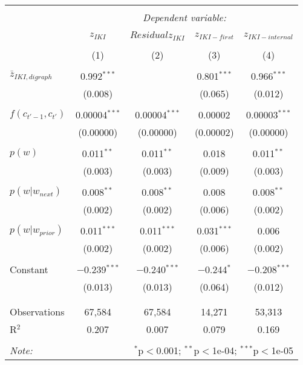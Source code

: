 
\begin{table*}[!htbp] \centering 
  \caption{} 
  \label{} 
\begin{tabular}{@{\extracolsep{5pt}}lcccc} 
\\[-1.8ex]\hline 
\hline \\[-1.8ex] 
 & \multicolumn{4}{c}{\textit{Dependent variable:}} \\ 
\cline{2-5} 
\\[-1.8ex] & $z_{IKI}$ & $Residual z_{IKI}$ & $z_{IKI-first}$ & $z_{IKI-internal}$ \\ 
\\[-1.8ex] & (1) & (2) & (3) & (4)\\ 
\hline \\[-1.8ex] 
 $\bar{z}_{IKI,digraph}$ & 0.992$^{***}$ &  & 0.801$^{***}$ & 0.966$^{***}$ \\ 
  & (0.008) &  & (0.065) & (0.012) \\ 
  & & & & \\ 
 $f(c_{t'-1},c_{t'})$ & 0.00004$^{***}$ & 0.00004$^{***}$ & 0.00002 & 0.00003$^{***}$ \\ 
  & (0.00000) & (0.00000) & (0.00002) & (0.00000) \\ 
  & & & & \\ 
 $p(w)$ & 0.011$^{**}$ & 0.011$^{**}$ & 0.018 & 0.011$^{**}$ \\ 
  & (0.003) & (0.003) & (0.009) & (0.003) \\ 
  & & & & \\ 
 $p(w|w_{next})$ & 0.008$^{**}$ & 0.008$^{**}$ & 0.008 & 0.008$^{**}$ \\ 
  & (0.002) & (0.002) & (0.006) & (0.002) \\ 
  & & & & \\ 
 $p(w|w_{prior})$ & 0.011$^{***}$ & 0.011$^{***}$ & 0.031$^{***}$ & 0.006 \\ 
  & (0.002) & (0.002) & (0.006) & (0.002) \\ 
  & & & & \\ 
 Constant & $-$0.239$^{***}$ & $-$0.240$^{***}$ & $-$0.244$^{*}$ & $-$0.208$^{***}$ \\ 
  & (0.013) & (0.013) & (0.064) & (0.012) \\ 
  & & & & \\ 
\hline \\[-1.8ex] 
Observations & 67,584 & 67,584 & 14,271 & 53,313 \\ 
R$^{2}$ & 0.207 & 0.007 & 0.079 & 0.169 \\ 
\hline 
\hline \\[-1.8ex] 
\textit{Note:}  & \multicolumn{4}{r}{$^{*}$p$<$0.001; $^{**}$p$<$1e-04; $^{***}$p$<$1e-05} \\ 
\end{tabular} 
\end{table*} 
